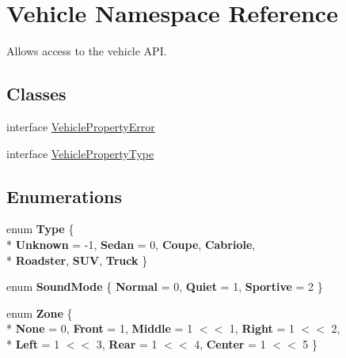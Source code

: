 \hypertarget{namespaceVehicle}{\section{Vehicle Namespace Reference}
\label{namespaceVehicle}
}


Allows access to the vehicle A\-P\-I.  


\subsection*{Classes}
\begin{DoxyCompactItemize}
\item 
interface \hyperlink{interfaceVehicle_1_1VehiclePropertyError}{Vehicle\-Property\-Error}
\item 
interface \hyperlink{interfaceVehicle_1_1VehiclePropertyType}{Vehicle\-Property\-Type}
\end{DoxyCompactItemize}
\subsection*{Enumerations}
\begin{DoxyCompactItemize}
\item 
enum {\bfseries Type} \{ \\*
{\bfseries Unknown} = -\/1, 
{\bfseries Sedan} = 0, 
{\bfseries Coupe}, 
{\bfseries Cabriole}, 
\\*
{\bfseries Roadster}, 
{\bfseries S\-U\-V}, 
{\bfseries Truck}
 \}
\item 
enum {\bfseries Sound\-Mode} \{ {\bfseries Normal} = 0, 
{\bfseries Quiet} = 1, 
{\bfseries Sportive} = 2
 \}
\item 
enum {\bfseries Zone} \{ \\*
{\bfseries None} = 0, 
{\bfseries Front} = 1, 
{\bfseries Middle} = 1 $<$$<$ 1, 
{\bfseries Right} = 1 $<$$<$ 2, 
\\*
{\bfseries Left} = 1 $<$$<$ 3, 
{\bfseries Rear} = 1 $<$$<$ 4, 
{\bfseries Center} = 1 $<$$<$ 5
 \}
\end{DoxyCompactItemize}
